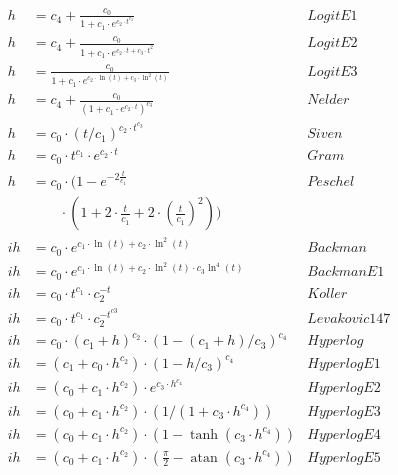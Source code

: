\documentclass[a4paper,twocolumn]{article}
\DeclareMathOperator{\atan}{atan}
\begin{document}
\begin{table*}
\begin{minipage}[t]{.5\textwidth}
\begin{align*}
  \label{eq:logitE1}
  h &= c_4 + \frac{c_0}{1+c_1 \cdot e^{c_2 \cdot t^{c_3}}} & LogitE1 \tag{6.1}\\
  \label{eq:logitE2}
  h &= c_4 + \frac{c_0}{1+c_1 \cdot e^{c_2 \cdot t + c_3 \cdot t^2}} & LogitE2 \tag{6.2}\\
  \label{eq:logitE3}
  h &= \frac{c_0}{1+c_1 \cdot e^{c_2 \cdot \ln(t) + c_3 \cdot \ln^2(t)}} & LogitE3 \tag{6.3}\\
  \label{eq:nelder}
  h &= c_4 + \frac{c_0}{(1+c_1 \cdot e^{c_2 \cdot t})^{c_3}} & Nelder \tag{6.4}\\[1em]
  \label{eq:siven}
  h & = c_0 \cdot (t/c_1)^{c_2\cdot t^{c_3}} & Siven \tag{7.0}\\
  \label{eq:gram}
  h & = c_0 \cdot t^{c_1} \cdot e^{c_2 \cdot t} & Gram \tag{7.1}\\
  \label{eq:peschel}
  h &= c_0 \cdot (1 - e^{-2\frac{t}{c_1}} & Peschel \tag{7.2}\\
  \nonumber & \qquad \cdot (1 + 2\cdot \frac{t}{c_1} + 2\cdot
  (\frac{t}{c_1})^2))\\[1em]
  \label{eq:backman}
  ih & = c_0 \cdot e^{c_1 \cdot \ln(t)+c_2 \cdot \ln^2(t)} & Backman \tag{8.0}\\
  \label{eq:backmanE1}
  ih & = c_0 \cdot e^{c_1 \cdot \ln(t)+c_2 \cdot \ln^2(t) \cdot c_3 \ln^4(t)} & BackmanE1 \tag{8.1}\\
  \label{eq:koller}
  ih &= c_0 \cdot t^{c_1} \cdot c_2^{-t} & Koller \tag{8.2}\\
  \label{eq:levakovicIh}
  ih &= c_0 \cdot t^{c_1} \cdot c_2^{-t^{c3}} & Levakovic147 \tag{8.3}\\[1em]
  \label{eq:hyperlogistic}
  ih &= c_0 \cdot (c_1 + h)^{c_2} \cdot (1-(c_1 + h)/c_3)^{c_4} & Hyperlog \tag{9.0}\\
  \label{eq:hyperlogisticE1}
  ih &= (c_1 + c_0 \cdot h^{c_2}) \cdot (1-h/c_3)^{c_4} & HyperlogE1 \tag{9.1}\\
  \label{eq:hyperlogisticE2}
  ih &= (c_0 + c_1 \cdot h^{c_2}) \cdot e^{c_3 \cdot h^{c_4}} & HyperlogE2 \tag{9.2}\\
  \label{eq:hyperlogisticE3}
  ih &= (c_0 + c_1 \cdot h^{c_2}) \cdot (1/(1 + c_3\cdot h^{c_4})) & HyperlogE3 \tag{9.3}\\
  \label{eq:hyperlogisticE4}
  ih &= (c_0 + c_1 \cdot h^{c_2}) \cdot (1 - \tanh(c_3 \cdot h^{c_4})) & HyperlogE4 \tag{9.4}\\
  \label{eq:hyperlogisticE5}
  ih &= (c_0 + c_1 \cdot h^{c_2}) \cdot (\frac{\pi}{2} - \atan(c_3\cdot h^{c_4})) & HyperlogE5 \tag{9.5}
\end{align*}
\end{minipage}
\end{table*}
\end{document}

